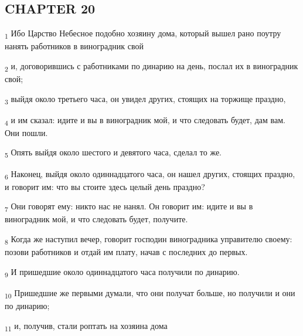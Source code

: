 \subsection{CHAPTER 20}
\begin{tcolorbox}
\textsubscript{1} Ибо Царство Небесное подобно хозяину дома, который вышел рано поутру нанять работников в виноградник свой
\end{tcolorbox}
\begin{tcolorbox}
\textsubscript{2} и, договорившись с работниками по динарию на день, послал их в виноградник свой;
\end{tcolorbox}
\begin{tcolorbox}
\textsubscript{3} выйдя около третьего часа, он увидел других, стоящих на торжище праздно,
\end{tcolorbox}
\begin{tcolorbox}
\textsubscript{4} и им сказал: идите и вы в виноградник мой, и что следовать будет, дам вам. Они пошли.
\end{tcolorbox}
\begin{tcolorbox}
\textsubscript{5} Опять выйдя около шестого и девятого часа, сделал то же.
\end{tcolorbox}
\begin{tcolorbox}
\textsubscript{6} Наконец, выйдя около одиннадцатого часа, он нашел других, стоящих праздно, и говорит им: что вы стоите здесь целый день праздно?
\end{tcolorbox}
\begin{tcolorbox}
\textsubscript{7} Они говорят ему: никто нас не нанял. Он говорит им: идите и вы в виноградник мой, и что следовать будет, получите.
\end{tcolorbox}
\begin{tcolorbox}
\textsubscript{8} Когда же наступил вечер, говорит господин виноградника управителю своему: позови работников и отдай им плату, начав с последних до первых.
\end{tcolorbox}
\begin{tcolorbox}
\textsubscript{9} И пришедшие около одиннадцатого часа получили по динарию.
\end{tcolorbox}
\begin{tcolorbox}
\textsubscript{10} Пришедшие же первыми думали, что они получат больше, но получили и они по динарию;
\end{tcolorbox}
\begin{tcolorbox}
\textsubscript{11} и, получив, стали роптать на хозяина дома
\end{tcolorbox}
